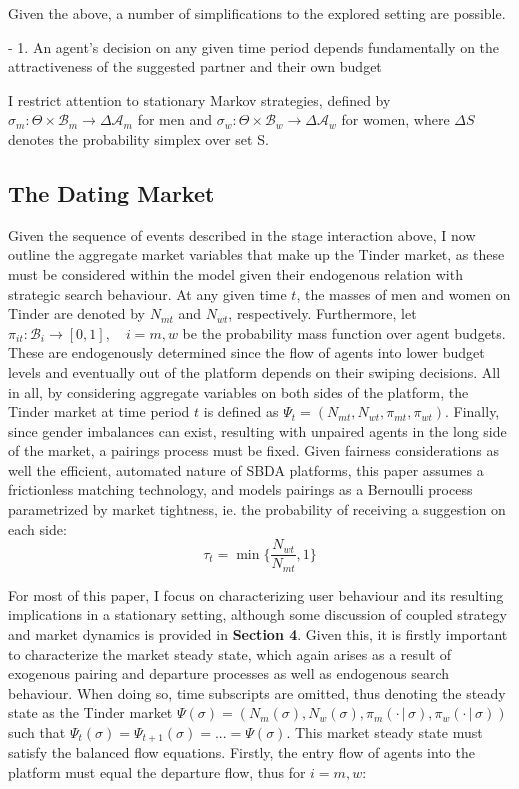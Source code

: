 Given the above, a number of simplifications to the explored setting are possible. 

- 1. An agent’s decision on any given time period depends fundamentally on the attractiveness of the suggested partner and their own budget

I restrict attention to stationary Markov strategies, defined by $\sigma_m: \Theta \times\mathcal{B}_m\rightarrow \Delta\mathcal{A}_m$ for men and $\sigma_w:\Theta \times\mathcal{B}_w\rightarrow \Delta\mathcal{A}_w$ for women, where $\Delta S$ denotes the probability simplex over set S. 

\subsection{The Dating Market}
Given the sequence of events described in the stage interaction above, I now outline the aggregate market variables that make up the Tinder market, as these must be considered within the model given their endogenous relation with strategic search behaviour. At any given time $t$, the masses of men and women on Tinder are denoted by $N_{mt}$ and $N_{wt}$, respectively. Furthermore, let $\pi_{it}:\mathcal{B}_{i}\rightarrow[0,1], \quad i=m,w$ be the probability mass function over agent budgets. These are endogenously determined since the flow of agents into lower budget levels and eventually out of the platform depends on their swiping decisions. All in all, by considering aggregate variables on both sides of the platform, the Tinder market at time period $t$ is defined as $\Psi_t=(N_{mt},N_{wt},\pi_{mt},\pi_{wt})$. Finally, since gender imbalances can exist, resulting with unpaired agents in the long side of the market, a pairings process must be fixed. Given fairness considerations as well the efficient, automated nature of SBDA platforms, this paper assumes a frictionless matching technology, and models pairings as a Bernoulli process parametrized by market tightness, ie. the probability of receiving a suggestion on each side:
$$
\tau_t=\min \Big\{\frac{N_{wt}}{N_{mt}} ,1 \Big\} 
$$

For most of this paper, I focus on characterizing user behaviour and its resulting implications in a stationary setting, although some discussion of coupled strategy and market dynamics is provided in \textbf{Section 4}. Given this, it is firstly important to characterize the market steady state, which again arises as a result of exogenous pairing and departure processes as well as endogenous search behaviour. When doing so, time subscripts are omitted, thus denoting the steady state as the Tinder market $\Psi(\sigma)=(N_m(\sigma),N_w(\sigma),\pi_m(\cdot \,|\, \sigma),\pi_w(\cdot \,|\, \sigma))$ such that $\Psi_t(\sigma)=\Psi_{t+1}(\sigma)=...=\Psi(\sigma)$. This market steady state must satisfy the balanced flow equations. Firstly, the entry flow of agents into the platform must equal the departure flow, thus for $i=m,w$: 

